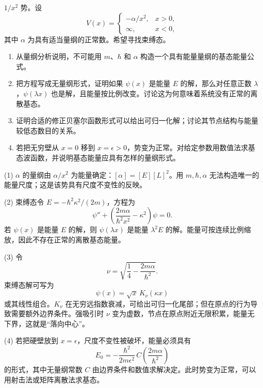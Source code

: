 \begin{question}
$1/x^2$ 势。设
\[
V(x)=\begin{cases}-\alpha/x^2,&x>0,\\ \infty,&x<0,
\end{cases}
\]
其中 $\alpha$ 为具有适当量纲的正常数。希望寻找束缚态。
\begin{enumerate}
\item 从量纲分析说明，不可能用 $m$、$\hbar$ 和 $\alpha$ 构造一个具有能量量纲的基态能量公式。
\item 把方程写成无量纲形式，证明如果 $\psi(x)$ 是能量 $E$ 的解，那么对任意正数 $\lambda$，$\psi(\lambda x)$ 也是解，且能量按比例改变。讨论这为何意味着系统没有正常的离散基态。
\item 证明合适的修正贝塞尔函数形式可以给出可归一化解；讨论其节点结构与能量较低态数目的关系。
\item 若把无穷壁从 $x=0$ 移到 $x=\epsilon>0$，势变为正常。对给定参数用数值法求基态波函数，并说明基态能量应具有怎样的量纲形式。
\end{enumerate}
\end{question}
\begin{solution}
(1) $\alpha$ 的量纲由 $\alpha/x^2$ 为能量确定：$[\alpha]=[E][L]^2$。用 $m,\hbar,\alpha$ 无法构造唯一的能量尺度；这是该势具有尺度不变性的反映。

(2) 束缚态令 $E=-\hbar^2\kappa^2/(2m)$，方程为
\[
\psi''+\left(\frac{2m\alpha}{\hbar^2x^2}-\kappa^2\right)\psi=0.
\]
若 $\psi(x)$ 是能量 $E$ 的解，则 $\psi(\lambda x)$ 是能量 $\lambda^2E$ 的解。能量可按连续比例缩放，因此不存在正常的离散基态能量。

(3) 令
\[
\nu=\sqrt{\frac14-\frac{2m\alpha}{\hbar^2}}.
\]
束缚态解可写为
\[
\psi(x)=\sqrt{x}\,K_\nu(\kappa x)
\]
或其线性组合。$K_\nu$ 在无穷远指数衰减，可给出可归一化尾部；但在原点的行为导致需要额外边界条件。强吸引时 $\nu$ 变为虚数，节点在原点附近无限积累，能量无下界，这就是“落向中心”。

(4) 若把硬壁放到 $x=\epsilon$，尺度不变性被破坏，能量必须具有
\[
E_0=-\frac{\hbar^2}{2m\epsilon^2}\,C\left(\frac{2m\alpha}{\hbar^2}\right)
\]
的形式，其中无量纲常数 $C$ 由边界条件和数值求解决定。此时势变为正常，可以用射击法或矩阵离散法求基态。
\end{solution}


